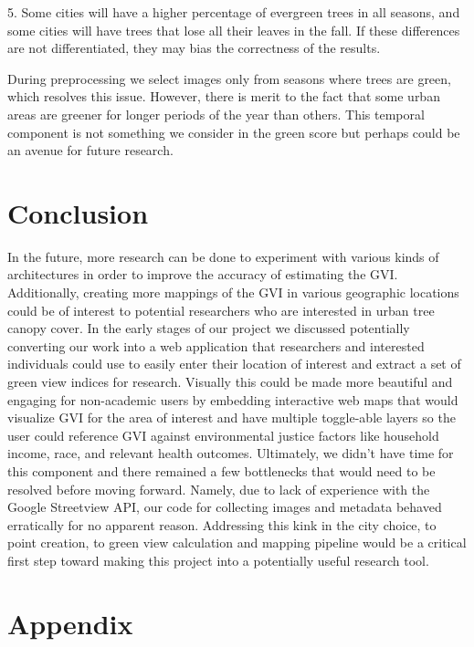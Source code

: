 5. Some cities will have a higher percentage of evergreen trees in all seasons, and
some cities will have trees that lose all their leaves in the fall. If these differences
are not differentiated, they may bias the correctness of the results.

During preprocessing we select images only from seasons where trees are green, which resolves this issue. However, there is merit to the fact that some urban areas are greener for longer periods of the year than others. This temporal component is not something we consider in the green score but perhaps could be an avenue for future research.


\section{Conclusion}

In the future, more research can be done to experiment with various kinds of architectures in order to improve the accuracy of estimating the GVI. Additionally, creating more mappings of the GVI in various geographic locations could be of interest to potential researchers who are interested in urban tree canopy cover. In the early stages of our project we discussed potentially converting our work into a web application that researchers and interested individuals could use to easily enter their location of interest and extract a set of green view indices for research. Visually this could be made more beautiful and engaging for non-academic users by embedding interactive web maps that would visualize GVI for the area of interest and have multiple toggle-able layers so the user could reference GVI against environmental justice factors like household income, race, and relevant health outcomes. Ultimately, we didn’t have time for this component and there remained a few bottlenecks that would need to be resolved before moving forward. Namely, due to lack of experience with the Google Streetview API, our code for collecting images and metadata behaved erratically for no apparent reason. Addressing this kink in the city choice, to point creation, to green view calculation and mapping pipeline would be a critical first step toward making this project into a potentially useful research tool. 

{\small


}

\section*{Appendix}

